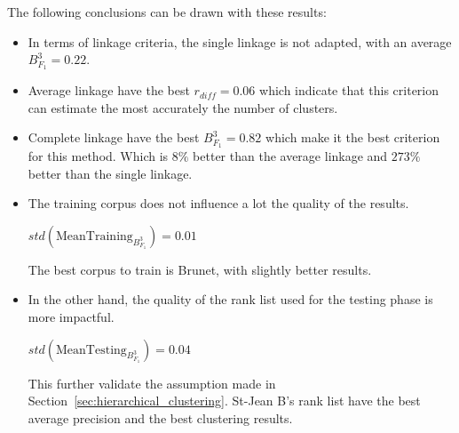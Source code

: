 The following conclusions can be drawn with these results:
\begin{itemize}
  \item
  In terms of linkage criteria, the single linkage is not adapted, with an average $B^3_{F_1} = 0.22$.
  \item
  Average linkage have the best $r_{diff} = 0.06$ which indicate that this criterion can estimate the most accurately the number of clusters.
  \item
  Complete linkage have the best $B^3_{F_1} = 0.82$ which make it the best criterion for this method. Which is $8\%$ better than the average linkage and $273\%$ better than the single linkage.
  \item
  The training corpus does not influence a lot the quality of the results.

  $std(\mathrm{MeanTraining}_{B^3_{F_1}}) = 0.01$

  The best corpus to train is Brunet, with slightly better results.
  \item
  In the other hand, the quality of the rank list used for the testing phase is more impactful.

  $std(\mathrm{MeanTesting}_{B^3_{F_1}}) = 0.04$

  This further validate the assumption made in Section~\ref{sec:hierarchical_clustering}.
  St-Jean B's rank list have the best average precision and the best clustering results.
\end{itemize}

